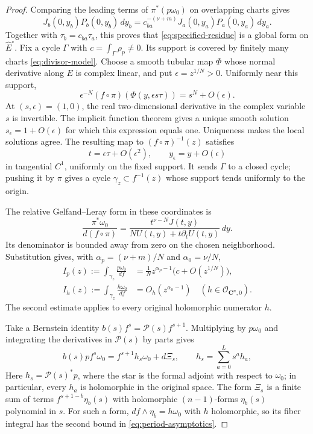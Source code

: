 \documentclass[11pt]{article}
\numberwithin{equation}{section}
\theoremstyle{definition}
\theoremstyle{remark}
\newcommand{\CC}{\mathbf C}
\newcommand{\OO}{\mathcal O}
\newcommand{\omegao}{\omega_0}
\begin{document}
\begin{proof}
Comparing the leading terms of $\pi^*(p\omegao)$ on
overlapping charts gives
\[
 J_b(0,y_b)P_b(0,y_b)\,dy_b
   =c_{ba}^{-(\nu+m)}J_a(0,y_a)P_a(0,y_a)\,dy_a.
\]
Together with $\tau_b=c_{ba}\tau_a$, this proves that
\eqref{eq:specified-residue} is a global form on
$\widehat E^\circ$.
Fix a cycle $\Gamma$ with $c=\int_\Gamma\rho_p\ne0$.
Its support is covered by finitely many charts
\eqref{eq:divisor-model}. Choose a smooth tubular map
$\Phi$ whose normal derivative along $E$ is complex linear,
and put $\epsilon=z^{1/N}>0$. Uniformly near this support,
\[
 \epsilon^{-N}(f\circ\pi)
       (\Phi(y,\epsilon s\tau))=s^N+O(\epsilon).
\]
At $(s,\epsilon)=(1,0)$, the real two-dimensional derivative
in the complex variable $s$ is invertible. The implicit function
theorem gives a unique smooth solution
$s_\epsilon=1+O(\epsilon)$ for which this expression equals
one. Uniqueness makes the local solutions agree. The resulting
map to $(f\circ\pi)^{-1}(z)$ satisfies
\[
 t=\epsilon\tau+O(\epsilon^2),\qquad
 y_{\epsilon}=y+O(\epsilon)
\]
in tangential $C^1$, uniformly on the fixed support. It sends
$\Gamma$ to a closed cycle; pushing it by $\pi$ gives a cycle
$\gamma_z\subset f^{-1}(z)$ whose support tends uniformly to
the origin.

The relative Gelfand--Leray form in these coordinates is
\[
 \frac{\pi^*\omegao}{d(f\circ\pi)}
 =\frac{t^{\nu-N}J(t,y)}{NU(t,y)+t\partial_tU(t,y)}\,dy.
\]
Its denominator is bounded away from zero on the chosen
neighborhood. Substitution gives, with
$\alpha_p=(\nu+m)/N$ and $\alpha_0=\nu/N$,
\begin{equation}\label{eq:period-asymptotics}
 \begin{split}
 I_p(z):=\int_{\gamma_z}\frac{p\omegao}{df}
   &=\frac1N z^{\alpha_p-1}
        \bigl(c+O(z^{1/N})\bigr),\\
 I_h(z):=\int_{\gamma_z}\frac{h\omegao}{df}
   &=O_h(z^{\alpha_0-1})
       \quad(h\in\OO_{\CC^n,0}).
 \end{split}
\end{equation}
The second estimate applies to every original holomorphic
numerator $h$.

Take a Bernstein identity $b(s)f^s=\mathcal P(s)f^{s+1}$. Multiplying
by $p\omegao$ and integrating the derivatives in $\mathcal P(s)$ by
parts gives
\begin{equation}\label{eq:green-identity}
 b(s)p f^s\omegao=f^{s+1}h_s\omegao+d\Xi_s,
 \qquad h_s=\sum_{a=0}^L s^a h_a,
\end{equation}
Here $h_s=\mathcal P(s)^*p$, where the star is the formal adjoint
with respect to $\omegao$; in particular, every $h_a$ is
holomorphic in the original space.
The form $\Xi_s$ is a finite sum of terms
$f^{s+1-b}\eta_b(s)$ with holomorphic $(n-1)$-forms
$\eta_b(s)$ polynomial in $s$.
For such a form, $df\wedge\eta_b=h\omegao$ with $h$
holomorphic, so its fiber integral has the second bound in
\eqref{eq:period-asymptotics}.


\end{proof}
\end{document}
